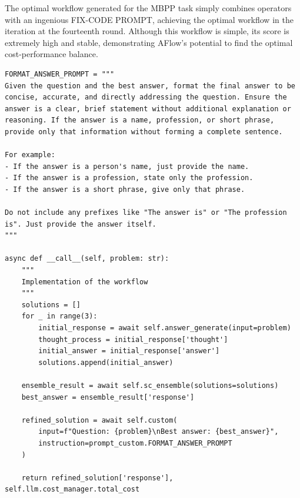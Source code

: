 \documentclass{article} %
\newcommand{\model}{{\sc AFlow}\xspace}
\theoremstyle{plain}
\theoremstyle{definition}
\theoremstyle{remark}
\begin{document}
The optimal workflow generated for the MBPP task simply combines operators with an ingenious FIX-CODE PROMPT, achieving the optimal workflow in the iteration at the fourteenth round. Although this workflow is simple, its score is extremely high and stable, demonstrating \model's potential to find the optimal cost-performance balance.

\begin{tcolorbox}[title={\textbf{\small The optimal workflow generated for HotpotQA}}, boxrule=1pt, arc=0mm, colback=black!5!white, colframe=black!75!white, breakable, before skip=10pt, after skip=10pt, pad at break=2mm, parbox=false] \begin{verbatim}
FORMAT_ANSWER_PROMPT = """
Given the question and the best answer, format the final answer to be concise, accurate, and directly addressing the question. Ensure the answer is a clear, brief statement without additional explanation or reasoning. If the answer is a name, profession, or short phrase, provide only that information without forming a complete sentence.

For example:
- If the answer is a person's name, just provide the name.
- If the answer is a profession, state only the profession.
- If the answer is a short phrase, give only that phrase.

Do not include any prefixes like "The answer is" or "The profession is". Just provide the answer itself.
"""

async def __call__(self, problem: str):
    """
    Implementation of the workflow
    """
    solutions = []
    for _ in range(3):
        initial_response = await self.answer_generate(input=problem)
        thought_process = initial_response['thought']
        initial_answer = initial_response['answer']
        solutions.append(initial_answer)

    ensemble_result = await self.sc_ensemble(solutions=solutions)
    best_answer = ensemble_result['response']

    refined_solution = await self.custom(
        input=f"Question: {problem}\nBest answer: {best_answer}",
        instruction=prompt_custom.FORMAT_ANSWER_PROMPT
    )

    return refined_solution['response'], self.llm.cost_manager.total_cost
\end{verbatim}
\end{tcolorbox}
\end{document}
